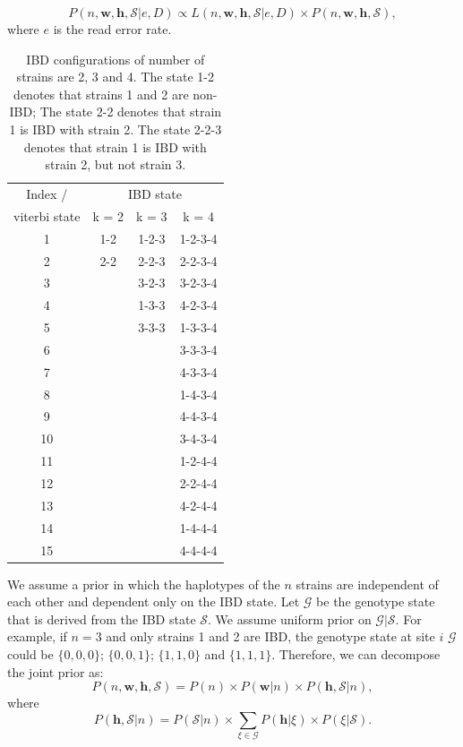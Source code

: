 \documentclass[9pt,lineno]{elife}
\begin{document}
\begin{equation}
P(n, \mathbf{w}, \mathbf{h}, \mathcal{S}| e, D) \propto L(n, \mathbf{w}, \mathbf{h}, \mathcal{S} | e, D) \times P(n, \mathbf{w}, \mathbf{h}, \mathcal{S}), \label{eqn:post}
\end{equation}
where $e$ is the read error rate.

\begin{table}
\centering
\begin{tabular}{c|ccc}
  Index / & \multicolumn{3}{c}{IBD state} \\
viterbi state    & k = 2& k = 3 & k = 4 \\ \hline
1	  &1-2	&	1-2-3	&1-2-3-4	\\
2	  &2-2	&	2-2-3	&2-2-3-4	\\
3	  &	  	&	3-2-3	&3-2-3-4	\\
4	  &		  &	1-3-3	&4-2-3-4	\\
5	  &		  &	3-3-3	&1-3-3-4	\\
6	  &	  	&		    &3-3-3-4	\\
7	  &	  	&		    &4-3-3-4	\\
8	  &	  	&	    	&1-4-3-4	\\
9	  &	  	&		    &4-4-3-4	\\
10	&	  	&		    &3-4-3-4	\\
11	&	  	&		    &1-2-4-4	\\
12	&		  &		    &2-2-4-4	\\
13	&	  	&		    &4-2-4-4	\\
14	&	  	&	    	&1-4-4-4	\\
15	&	  	&		    &4-4-4-4	\\
\end{tabular}
\caption{IBD configurations of number of strains are 2, 3 and 4. The state 1-2 denotes that strains 1 and 2 are non-IBD; The state 2-2 denotes that strain 1 is IBD with strain 2. The state 2-2-3 denotes that strain 1 is IBD with strain 2, but not strain 3. }\label{tab:encode}
\end{table}


\noindent We assume a prior in which the haplotypes of the $n$ strains are independent of each other and dependent only on the IBD state. Let $\mathcal{G}$ be the genotype state that is derived from the IBD state $\mathcal{S}$. We assume uniform prior on $\mathcal{G}|\mathcal{S}$. For example, if $n=3$ and only strains 1 and 2 are IBD, the genotype state at site $i$ $\mathcal{G}$ could be $\{0,0,0\}$; $\{0,0,1\}$; $\{1,1,0\}$ and $\{1,1,1\}$. Therefore, we can decompose the joint prior as:
\begin{equation}
P(n, \mathbf{w}, \mathbf{h}, \mathcal{S}) = P(n) \times P(\mathbf{w}|n) \times P(\mathbf{h} , \mathcal{S}|n),
\end{equation}
where
\begin{equation}
P(\mathbf{h}, \mathcal{S}|n) = P(\mathcal{S}|n) \times \sum_{\xi \in \mathcal{G}} P(\mathbf{h} | \xi) \times P(\xi|\mathcal{S}).
\label{eqn:}
\end{equation}
\end{document}
